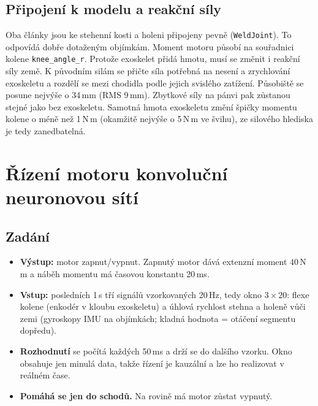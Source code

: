 \documentclass[11pt,a4paper]{article}
\newcommand{\Nm}{\,N\,m}
\begin{document}
\subsection{Připojení k modelu a reakční síly}\label{sec:pripojeni}
Oba články jsou ke stehenní kosti a holeni připojeny pevně (\texttt{WeldJoint}). To odpovídá
dobře dotaženým objímkám. Moment motoru působí na souřadnici kolene \texttt{knee\_angle\_r}.
Protože exoskelet přidá hmotu, musí se změnit i reakční síly země. K původním silám se přičte
síla potřebná na nesení a zrychlování exoskeletu a rozdělí se mezi chodidla podle jejich
svislého zatížení. Působiště se posune nejvýše o 34\,mm (RMS 9\,mm). Zbytkové síly na pánvi
pak zůstanou stejné jako bez exoskeletu.
Samotná hmota exoskeletu změní špičky momentu kolene o méně než 1\Nm{}
(okamžitě nejvýše o 5\Nm{} ve švihu), ze silového hlediska je tedy zanedbatelná.

\section{Řízení motoru konvoluční neuronovou sítí}\label{sec:cnn}

\subsection{Zadání}
\begin{itemize}
  \item \textbf{Výstup:} motor zapnut/vypnut. Zapnutý motor dává extenzní moment 40\Nm{}
        a náběh momentu má časovou konstantu 20\,ms.
  \item \textbf{Vstup:} posledních 1\,s tří signálů vzorkovaných 20\,Hz, tedy okno $3\times20$:
        flexe kolene (enkodér v kloubu exoskeletu) a úhlová rychlost stehna a holeně vůči zemi
        (gyroskopy IMU na objímkách; kladná hodnota = otáčení segmentu dopředu).
  \item \textbf{Rozhodnutí} se počítá každých 50\,ms a drží se do dalšího vzorku.
        Okno obsahuje jen minulá data, takže řízení je kauzální a lze ho realizovat v reálném čase.
  \item \textbf{Pomáhá se jen do schodů.} Na rovině má motor zůstat vypnutý.
\end{itemize}
\end{document}
